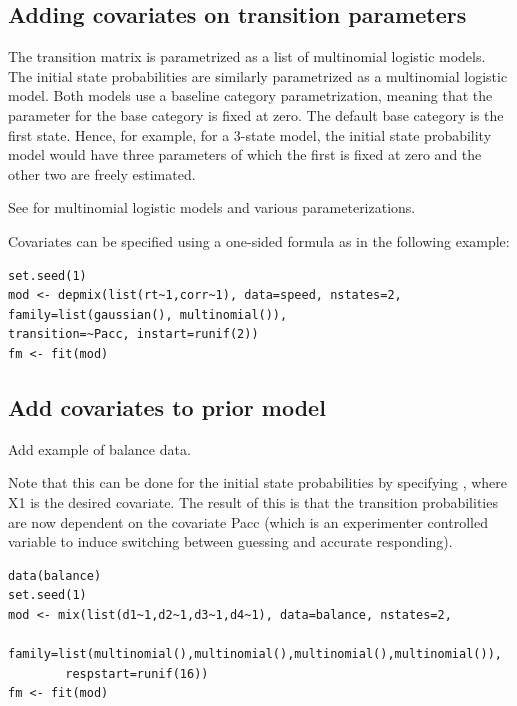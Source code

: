 \documentclass[article]{jss}
\begin{document}
\subsection{Adding covariates on transition parameters}

The transition matrix is parametrized as a list of multinomial
logistic models.  The initial state probabilities are similarly
parametrized as a multinomial logistic model.  Both models use a baseline
category parametrization, meaning that the parameter for the base
category is fixed at zero.  The default base category is the first
state.  Hence, for example, for a 3-state model, the initial state
probability model would have three parameters of which the first is
fixed at zero and the other two are freely estimated.

See \citet[see][p.\ 267 ff.]{Agresti2002} for multinomial logistic models and various
parameterizations. 

Covariates can be specified using a one-sided formula as in the
following example:

\begin{verbatim}
set.seed(1)
mod <- depmix(list(rt~1,corr~1), data=speed, nstates=2, family=list(gaussian(), multinomial()),
transition=~Pacc, instart=runif(2))
fm <- fit(mod)
\end{verbatim}





\subsection{Add covariates to prior model}

Add example of balance data. 

Note that this can be done for the initial state probabilities by
specifying , where X1 is the desired covariate.  The result
of this is that the transition probabilities are now dependent on the
covariate Pacc (which is an experimenter controlled variable to induce
switching between guessing and accurate responding). 

\begin{verbatim}
data(balance)
set.seed(1)
mod <- mix(list(d1~1,d2~1,d3~1,d4~1), data=balance, nstates=2,
        family=list(multinomial(),multinomial(),multinomial(),multinomial()),
        respstart=runif(16))
fm <- fit(mod)
\end{verbatim}
\end{document}
